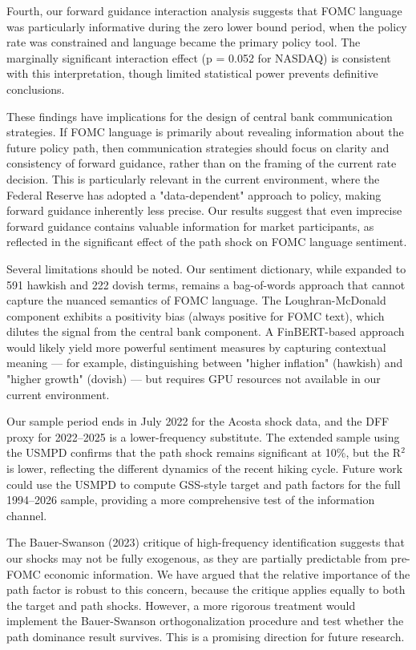 Fourth, our forward guidance interaction analysis suggests that FOMC language was particularly informative during the zero lower bound period, when the policy rate was constrained and language became the primary policy tool. The marginally significant interaction effect (p = 0.052 for NASDAQ) is consistent with this interpretation, though limited statistical power prevents definitive conclusions.

These findings have implications for the design of central bank communication strategies. If FOMC language is primarily about revealing information about the future policy path, then communication strategies should focus on clarity and consistency of forward guidance, rather than on the framing of the current rate decision. This is particularly relevant in the current environment, where the Federal Reserve has adopted a "data-dependent" approach to policy, making forward guidance inherently less precise. Our results suggest that even imprecise forward guidance contains valuable information for market participants, as reflected in the significant effect of the path shock on FOMC language sentiment.

Several limitations should be noted. Our sentiment dictionary, while expanded to 591 hawkish and 222 dovish terms, remains a bag-of-words approach that cannot capture the nuanced semantics of FOMC language. The Loughran-McDonald component exhibits a positivity bias (always positive for FOMC text), which dilutes the signal from the central bank component. A FinBERT-based approach would likely yield more powerful sentiment measures by capturing contextual meaning --- for example, distinguishing between "higher inflation" (hawkish) and "higher growth" (dovish) --- but requires GPU resources not available in our current environment.

Our sample period ends in July 2022 for the Acosta shock data, and the DFF proxy for 2022--2025 is a lower-frequency substitute. The extended sample using the USMPD confirms that the path shock remains significant at 10\%, but the R$^2$ is lower, reflecting the different dynamics of the recent hiking cycle. Future work could use the USMPD to compute GSS-style target and path factors for the full 1994--2026 sample, providing a more comprehensive test of the information channel.

The Bauer-Swanson (2023) critique of high-frequency identification suggests that our shocks may not be fully exogenous, as they are partially predictable from pre-FOMC economic information. We have argued that the relative importance of the path factor is robust to this concern, because the critique applies equally to both the target and path shocks. However, a more rigorous treatment would implement the Bauer-Swanson orthogonalization procedure and test whether the path dominance result survives. This is a promising direction for future research.

